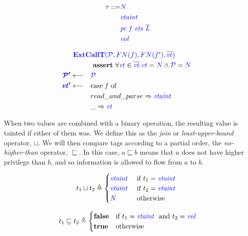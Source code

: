 \documentclass{llncs}
\begin{document}
\begin{minipage}{0.25\textwidth}
{ \color{blue}
  \begin{align*}
    \tau ::= & {\color{blue} N} \\
    & \mathit{\color{blue} vtaint ~ } \\
    & \mathit{\color{blue} pc ~ f ~ ets ~ \overline{L}} \\
    & \mathit{\color{blue} vol} \\
\end{align*} }
\end{minipage}
\begin{minipage}{0.74\textwidth}
\[\begin{aligned}
\truledef{\extcallt}
\assert{\forall \vt \in \overline{\vt} . \vt = \N \land \PCT = \N}
\settag{\PCT'}{\PCT}
\settag{\vt'}{\caseof{f}}
\caseentry{read\_and\_parse}{\vtaint{}} \\
\caseentry{\_}{\vt} \\
\end{aligned}\]
\end{minipage}

When two values are combined with a binary operation, the resulting value is tainted
if either of them was. We define this as the {\em join} or {\em least-upper-bound}
operator, \(\sqcup\). We will then compare tags according to a partial order, the
{\em no-higher-than} operator, \(\sqsubseteq\). In this case, \(a \sqsubseteq b\)
means that \(a\) does not have higher privilege than \(b\), and so information is
allowed to flow from \(a\) to \(b\).

\begin{minipage}[t]{.49\textwidth}
\[t_1 \sqcup t_2 \triangleq
\begin{cases}
  \mathit{\color{blue} vtaint ~ } & \textnormal{if } t_1 = \mathit{\color{blue} vtaint ~ } \\
  \mathit{\color{blue} vtaint ~ } & \textnormal{if } t_2 = \mathit{\color{blue} vtaint ~ } \\
  {\color{blue} N} & \textnormal{otherwise} \\
\end{cases}\]
\end{minipage}
\begin{minipage}[t]{.49\textwidth}
\[t_1 \sqsubseteq t_2 \triangleq
\begin{cases}
  \mathbf{false} & \textnormal{if } t_1 = \mathit{\color{blue} vtaint ~ } \textnormal{ and } t_2 = \mathit{\color{blue} vol} \\
  \mathbf{true} & \textnormal{otherwise} \\
\end{cases}\]
\end{minipage}
\end{document}
